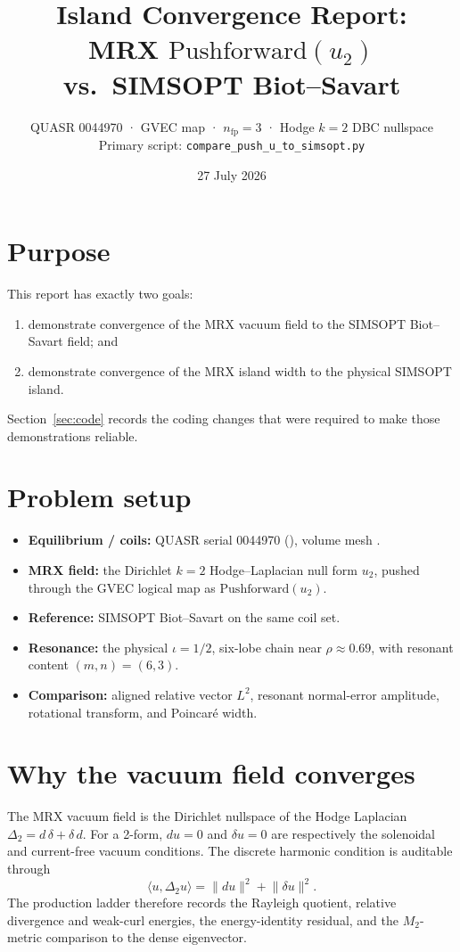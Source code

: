 \documentclass[11pt,a4paper]{article}
\title{Island Convergence Report:\\
MRX \(\mathrm{Pushforward}(u_2)\) vs.\ SIMSOPT Biot--Savart}
\author{QUASR 0044970 · GVEC map · \(n_{\mathrm{fp}}=3\) · Hodge \(k=2\) DBC nullspace\\[0.4em]
\large Primary script: \texttt{compare\_push\_u\_to\_simsopt.py}}
\date{27 July 2026}
\begin{document}
\maketitle

\section*{Purpose}
This report has exactly two goals:
\begin{enumerate}[leftmargin=1.8em]
  \item demonstrate convergence of the MRX vacuum field to the SIMSOPT
  Biot--Savart field; and
  \item demonstrate convergence of the MRX island width to the physical
  SIMSOPT island.
\end{enumerate}
Section~\ref{sec:code} records the coding changes that were required to make
those demonstrations reliable.

\section{Problem setup}

\begin{itemize}[leftmargin=1.5em,itemsep=0.2em]
  \item \textbf{Equilibrium / coils:} QUASR serial 0044970
  (), volume mesh
  .
  \item \textbf{MRX field:} the Dirichlet \(k=2\) Hodge--Laplacian null form
  \(u_2\), pushed through the GVEC logical map as
  \(\mathrm{Pushforward}(u_2)\).
  \item \textbf{Reference:} SIMSOPT Biot--Savart on the same coil set.
  \item \textbf{Resonance:} the physical \(\iota=1/2\), six-lobe chain near
  \(\rho\approx0.69\), with resonant content \((m,n)=(6,3)\).
  \item \textbf{Comparison:} aligned relative vector \(L^2\), resonant
  normal-error amplitude, rotational transform, and Poincaré width.
\end{itemize}

\section{Why the vacuum field converges}
\label{sec:why}

The MRX vacuum field is the Dirichlet nullspace of the Hodge Laplacian
\(\Delta_2=d\,\delta+\delta\,d\).  For a 2-form, \(du=0\) and \(\delta u=0\)
are respectively the solenoidal and current-free vacuum conditions.  The
discrete harmonic condition is auditable through
\begin{equation}
\label{eq:energy}
\langle u,\Delta_2u\rangle=\lVert du\rVert^2+\lVert\delta u\rVert^2 .
\end{equation}
The production ladder therefore records the Rayleigh quotient, relative
divergence and weak-curl energies, the energy-identity residual, and the
\(M_2\)-metric comparison to the dense eigenvector.
\end{document}
